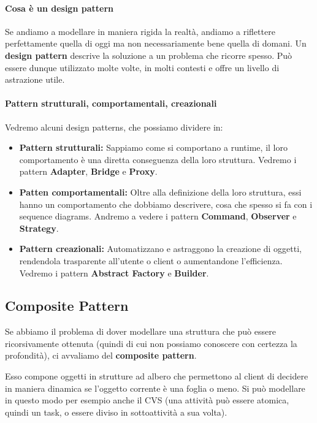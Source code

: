         \paragraph{Cosa è un design pattern}
            Se andiamo a modellare in maniera rigida la realtà, andiamo a riflettere perfettamente quella di oggi ma non necessariamente bene quella di domani. Un \textbf{design pattern} descrive la soluzione a un problema che ricorre spesso. Può essere dunque utilizzato molte volte, in molti contesti e offre un livello di astrazione utile.
            
        \paragraph{Pattern strutturali, comportamentali, creazionali}
            Vedremo alcuni design patterns, che possiamo dividere in:
            \begin{itemize}
                \item \textbf{Pattern strutturali:} Sappiamo come si comportano a runtime, il loro comportamento è una diretta conseguenza della loro struttura. Vedremo i pattern \textbf{Adapter}, \textbf{Bridge} e \textbf{Proxy}.
                \item \textbf{Patten comportamentali:} Oltre alla definizione della loro struttura, essi hanno un comportamento che dobbiamo descrivere, cosa che spesso si fa con i sequence diagrams. Andremo a vedere i pattern \textbf{Command}, \textbf{Observer} e \textbf{Strategy}.
                \item \textbf{Pattern creazionali:} Automatizzano e astraggono la creazione di oggetti, rendendola trasparente all'utente o client o aumentandone l'efficienza. Vedremo i pattern \textbf{Abstract Factory} e \textbf{Builder}.
            \end{itemize}
            
        \subsection{Composite Pattern}
            Se abbiamo il problema di dover modellare una struttura che può essere ricorsivamente ottenuta (quindi di cui non possiamo conoscere con certezza la profondità), ci avvaliamo del \textbf{composite pattern}.
            
            
            Esso compone oggetti in strutture ad albero che permettono al client di decidere in maniera dinamica se l'oggetto corrente è una foglia o meno. Si può modellare in questo modo per esempio anche il CVS (una attività può essere atomica, quindi un task, o essere diviso in sottoattività a sua volta).
            
